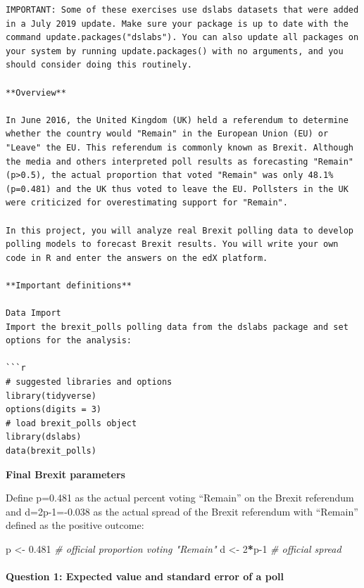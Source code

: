 \documentclass[
]{article}
\newenvironment{Shaded}{\begin{snugshade}}{\end{snugshade}}
\newcommand{\CommentTok}[1]{\textcolor[rgb]{0.56,0.35,0.01}{\textit{#1}}}
\newcommand{\DecValTok}[1]{\textcolor[rgb]{0.00,0.00,0.81}{#1}}
\newcommand{\FloatTok}[1]{\textcolor[rgb]{0.00,0.00,0.81}{#1}}
\newcommand{\NormalTok}[1]{#1}
\newcommand{\OperatorTok}[1]{\textcolor[rgb]{0.81,0.36,0.00}{\textbf{#1}}}
\newcommand{\StringTok}[1]{\textcolor[rgb]{0.31,0.60,0.02}{#1}}
\begin{document}
\begin{verbatim}
IMPORTANT: Some of these exercises use dslabs datasets that were added in a July 2019 update. Make sure your package is up to date with the command update.packages("dslabs"). You can also update all packages on your system by running update.packages() with no arguments, and you should consider doing this routinely.

**Overview**

In June 2016, the United Kingdom (UK) held a referendum to determine whether the country would "Remain" in the European Union (EU) or "Leave" the EU. This referendum is commonly known as Brexit. Although the media and others interpreted poll results as forecasting "Remain" (p>0.5), the actual proportion that voted "Remain" was only 48.1% (p=0.481) and the UK thus voted to leave the EU. Pollsters in the UK were criticized for overestimating support for "Remain". 

In this project, you will analyze real Brexit polling data to develop polling models to forecast Brexit results. You will write your own code in R and enter the answers on the edX platform.

**Important definitions**

Data Import  
Import the brexit_polls polling data from the dslabs package and set options for the analysis:

```r
# suggested libraries and options
library(tidyverse)
options(digits = 3)
# load brexit_polls object
library(dslabs)
data(brexit_polls)
\end{verbatim}

\textbf{Final Brexit parameters}

Define p=0.481 as the actual percent voting ``Remain'' on the Brexit
referendum and d=2p-1=-0.038 as the actual spread of the Brexit
referendum with ``Remain'' defined as the positive outcome:

\begin{Shaded}
\begin{Highlighting}[]
\NormalTok{p \textless{}{-}}\StringTok{ }\FloatTok{0.481}    \CommentTok{\# official proportion voting "Remain"}
\NormalTok{d \textless{}{-}}\StringTok{ }\DecValTok{2}\OperatorTok{*}\NormalTok{p}\DecValTok{{-}1}    \CommentTok{\# official spread}
\end{Highlighting}
\end{Shaded}

\hypertarget{question-1-expected-value-and-standard-error-of-a-poll}{%
\paragraph{Question 1: Expected value and standard error of a
poll}\label{question-1-expected-value-and-standard-error-of-a-poll}}
\end{document}
